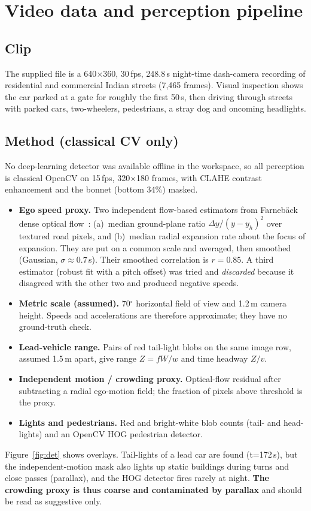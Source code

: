 \documentclass[11pt,a4paper]{article}
\begin{document}
\section{Video data and perception pipeline}
\subsection{Clip}
The supplied file is a 640$\times$360, 30\,fps, 248.8\,s night-time dash-camera recording of residential and commercial Indian streets (7{,}465 frames). Visual inspection shows the car parked at a gate for roughly the first 50\,s, then driving through streets with parked cars, two-wheelers, pedestrians, a stray dog and oncoming headlights.

\subsection{Method (classical CV only)}
No deep-learning detector was available offline in the workspace, so all perception is classical OpenCV on 15\,fps, 320$\times$180 frames, with CLAHE contrast enhancement and the bonnet (bottom 34\%) masked.
\begin{itemize}\setlength\itemsep{0pt}
\item \textbf{Ego speed proxy.} Two independent flow-based estimators from Farneb\"ack dense optical flow~\cite{farneback}: (a)~median ground-plane ratio $\Delta y/(y-y_h)^2$ over textured road pixels, and (b)~median radial expansion rate about the focus of expansion. They are put on a common scale and averaged, then smoothed (Gaussian, $\sigma\approx0.7$\,s). Their smoothed correlation is $r=0.85$. A third estimator (robust fit with a pitch offset) was tried and \emph{discarded} because it disagreed with the other two and produced negative speeds.
\item \textbf{Metric scale (assumed).} 70$^\circ$ horizontal field of view and 1.2\,m camera height. Speeds and accelerations are therefore approximate; they have no ground-truth check.
\item \textbf{Lead-vehicle range.} Pairs of red tail-light blobs on the same image row, assumed 1.5\,m apart, give range $Z=fW/w$ and time headway $Z/v$.
\item \textbf{Independent motion / crowding proxy.} Optical-flow residual after subtracting a radial ego-motion field; the fraction of pixels above threshold is the proxy.
\item \textbf{Lights and pedestrians.} Red and bright-white blob counts (tail- and head-lights) and an OpenCV HOG pedestrian detector.
\end{itemize}
Figure~\ref{fig:det} shows overlays. Tail-lights of a lead car are found (t=172\,s), but the independent-motion mask also lights up static buildings during turns and close passes (parallax), and the HOG detector fires rarely at night. \textbf{The crowding proxy is thus coarse and contaminated by parallax} and should be read as suggestive only.
\end{document}
